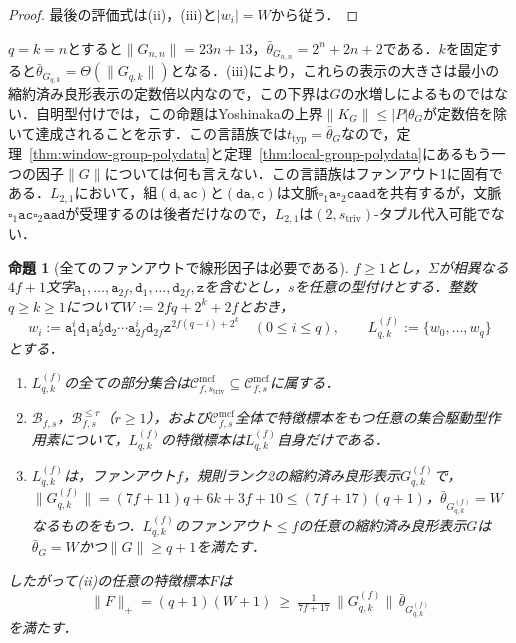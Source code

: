\documentclass[11pt,a4paper]{ltjsarticle}
\numberwithin{equation}{section}
\theoremstyle{plain}
\newtheorem{proposition}[theorem]{命題}
\theoremstyle{definition}
\theoremstyle{remark}
\newcommand{\Cmcf}[2]{\mathcal{C}^{\mathrm{mcf}}_{#1,#2}}
\newcommand{\blank}{\square}
\begin{document}
\begin{proof}
最後の評価式は(ii)，(iii)と$|w_i|=W$から従う．
\end{proof}

$q=k=n$とすると$\|G_{n,n}\|=23n+13$，$\bar\theta_{G_{n,n}}=2^n+2n+2$である．$k$を固定すると$\bar\theta_{G_{q,k}}=\Theta(\|G_{q,k}\|)$となる．(iii)により，これらの表示の大きさは最小の縮約済み良形表示の定数倍以内なので，この下界は$G$の水増しによるものではない．自明型付けでは，この命題はYoshinakaの上界$\|K_G\|\le|P|\theta_G$が定数倍を除いて達成されることを示す．この言語族では$t_{\mathrm{typ}}=\bar\theta_G$なので，定理~\ref{thm:window-group-polydata}と定理~\ref{thm:local-group-polydata}にあるもう一つの因子$\|G\|$については何も言えない．この言語族はファンアウト1に固有である．$L_{2,1}$において，組$(\mathtt d,\mathtt{ac})$と$(\mathtt{da},\mathtt c)$は文脈$\blank_1\mathtt a\blank_2\mathtt{caad}$を共有するが，文脈$\blank_1\mathtt{ac}\blank_2\mathtt{aad}$が受理するのは後者だけなので，$L_{2,1}$は$(2,s_{\mathrm{triv}})$-タプル代入可能でない．

\begin{proposition}[全てのファンアウトで線形因子は必要である]
\label{prop:linear-factor-all-fanout}
$f\ge1$とし，$\Sigma$が相異なる$4f+1$文字$\mathtt a_1,\ldots,\mathtt a_{2f},\mathtt d_1,\ldots,\mathtt d_{2f},\mathtt z$を含むとし，$s$を任意の型付けとする．整数$q\ge k\ge1$について$W:=2fq+2^k+2f$とおき，
\[
 w_i:=\mathtt a_1^i\mathtt d_1\mathtt a_2^i\mathtt d_2\cdots\mathtt a_{2f}^i\mathtt d_{2f}
 \mathtt z^{2f(q-i)+2^k}\quad(0\le i\le q),\qquad
 L^{(f)}_{q,k}:=\{w_0,\ldots,w_q\}
\]
とする．
\begin{enumerate}[label=\textup{(\roman*)},leftmargin=*]
\item $L^{(f)}_{q,k}$の全ての部分集合は$\Cmcf{f}{s_{\mathrm{triv}}}\subseteq\Cmcf{f}{s}$に属する．
\item $\mathcal B_{f,s}$，$\mathcal B^{\le r}_{f,s}$（$r\ge1$），および$\Cmcf{f}{s}$全体で特徴標本をもつ任意の集合駆動型作用素について，$L^{(f)}_{q,k}$の特徴標本は$L^{(f)}_{q,k}$自身だけである．
\item $L^{(f)}_{q,k}$は，ファンアウト$f$，規則ランク2の縮約済み良形表示$G^{(f)}_{q,k}$で，$\|G^{(f)}_{q,k}\|=(7f+11)q+6k+3f+10\le(7f+17)(q+1)$，$\bar\theta_{G^{(f)}_{q,k}}=W$なるものをもつ．$L^{(f)}_{q,k}$のファンアウト$\le f$の任意の縮約済み良形表示$G$は$\bar\theta_G=W$かつ$\|G\|\ge q+1$を満たす．
\end{enumerate}
したがって(ii)の任意の特徴標本$F$は
\[
 \|F\|_+=(q+1)(W+1)\ \ge\ \tfrac1{7f+17}\,\|G^{(f)}_{q,k}\|\,
 \bar\theta_{G^{(f)}_{q,k}}
\]
を満たす．
\end{proposition}
\end{document}
